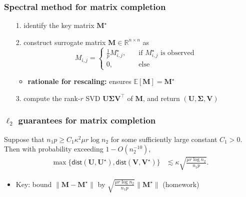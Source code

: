 \documentclass[compress,
mathserif,wide,%
]{beamer}
\begin{document}
\begin{frame}
\frametitle{Spectral method for matrix completion}

\begin{itemize}
	
	\item[{\color{black}1.}] identify the key matrix $\bm{M}^{\star}$
	\item[{\color{black}2.}] construct surrogate matrix ${\bm{M}}\in \mathbb{R}^{n\times n}$ as
	\[
		{M}_{i,j} = \begin{cases} \frac{1}{p} M_{i,j}^{\star}, \quad & \text{if }M_{i,j}^{\star}\text{ is observed} \\ 
					0,  & \text{else}	\end{cases} 
	\]
	\begin{itemize}
		\item {\bf rationale for rescaling:} ensures $\mathbb{E}[{\bm{M}}] = \bm{M}^{\star}$
	\end{itemize}

	\bigskip

\item[{\color{black}3.}] compute the rank-$r$ SVD ${\bm{U}}{\bm{\Sigma}}{\bm{V}}^{\top}$ of ${\bm{M}}$, and return $({\bm{U}}, {\bm{\Sigma}}, {\bm{V}})$

	
\end{itemize}


\end{frame}

\begin{frame}
	\frametitle{$\ell_{2}$ guarantees for matrix completion}
	\begin{theorem}
\label{thm:mc-l2-subspace}
Suppose that $n_{1}p\geq C_{1}\kappa^{2}\mu r\log n_{2}$ for some sufficiently
large constant $C_{1}>0$. Then with probability exceeding $1-O(n_2^{-10})$,
%
\begin{align*}
\max\Big\{ \mathsf{dist}\left(\bm{U},\bm{U}^{\star}\right),\mathsf{dist}\left(\bm{V},\bm{V}^{\star}\right)\Big\}  & \lesssim\kappa\sqrt{\frac{\mu r \log n_{2}}{n_{1}p}} .
\end{align*}
%
\end{theorem}

\vfill 
\begin{itemize}
	\item Key: bound $\|\bm{M} - \bm{M}^\star\|$ by $\sqrt{\frac{\mu r \log n_{2}}{n_{1}p}} \|\bm{M}^{\star}\|$ (homework)
\end{itemize}
\end{frame}
\end{document}
